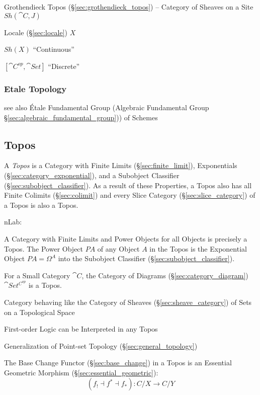 Grothendieck Topos (\S\ref{sec:grothendieck_topos}) -- Category of
Sheaves on a Site $Sh(\cat{C},J)$

Locale (\S\ref{sec:locale}) $X$

$Sh(X)$ ``Continuous''

$[\cat{C}^{op},\cat{Set}]$ ``Discrete''





\subsubsection{Etale Topology}\label{sec:etale_topology}

see also \'Etale Fundamental Group (Algebraic Fundamental Group
\S\ref{sec:algebraic_fundamental_group})) of Schemes



\subsection{Topos}\label{sec:topos}

A \emph{Topos} is a Category with Finite Limits
(\S\ref{sec:finite_limit}), Exponentials
(\S\ref{sec:category_exponential}), and a Subobject Classifier
(\S\ref{sec:subobject_classifier}). As a result of these Properties, a
Topos also has all Finite Colimits (\S\ref{sec:colimit}) and every
Slice Category (\S\ref{sec:slice_category}) of a Topos is also a
Topos.

nLab:

A Category with Finite Limits and Power Objects for all Objects is
precisely a Topos. The Power Object $P A$ of any Object $A$ in the
Topos is the Exponential Object $P A = \Omega^A$ into the Subobject
Classifier (\S\ref{sec:subobject_classifier}).

For a Small Category $\cat{C}$, the Category of Diagrams
(\S\ref{sec:category_diagram}) $\cat{Set^{C^{op}}}$ is a
Topos.\cite{awodey06}

Category behaving like the Category of Sheaves
(\S\ref{sec:sheave_category}) of Sets on a Topological Space

First-order Logic can be Interpreted in any Topos

Generalization of Point-set Topology (\S\ref{sec:general_topology})

The Base Change Functor (\S\ref{sec:base_change}) in a Topos is an
Essential Geometric Morphism (\S\ref{sec:essential_geometric}):
\[
  (f_! \dashv f^* \dashv f_*):C/X \rightarrow C/Y
\]



